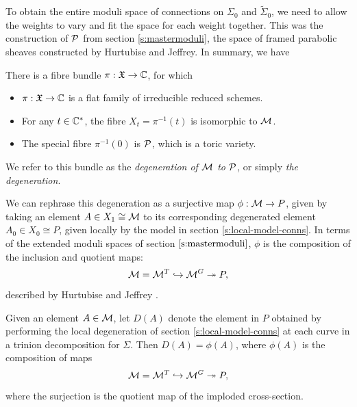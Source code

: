 	To obtain the entire moduli space of connections on $\Sigma_0$ and $\tilde{\Sigma}_0$, we need to allow the weights to vary and fit the space for each weight together. This was the construction of $\mathcal{P}$ from section \ref{s:mastermoduli}, the space of framed parabolic sheaves constructed by Hurtubise and Jeffrey. In summary, we have \cite[Theorems 3.17, 4.1]{biswas_degenerations_2021}
	\begin{theorem}
		\label{t:bishurt}
		There is a fibre bundle $\pi: \mathfrak{X} \to \mathbb{C}$, for which
		\begin{itemize}
			\item $\pi:\mathfrak{X}\to \mathbb{C}$ is a flat family of irreducible reduced schemes.
			\item For any $t\in \mathbb{C}^\ast$, the fibre $X_t = \pi^{-1}(t)$ is isomorphic to $\mathcal{M}$.
			\item The special fibre $\pi^{-1}(0)$ is $\mathcal{P}$, which is a toric variety.
		\end{itemize}
		We refer to this bundle as the \emph{degeneration of $\mathcal{M}$ to $\mathcal{P}$}, or simply \emph{the degeneration}.
	\end{theorem}
	We can rephrase this degeneration as a surjective map $\phi:\mathcal{M}\to P$, given by taking an element $A\in X_1 \cong \mathcal{M}$ to its corresponding degenerated element $A_0 \in X_0 \cong P$, given locally by the model in section \ref{s:local-model-conns}. In terms of the extended moduli spaces of section $\ref{s:mastermoduli}$, $\phi$ is the composition of the inclusion and quotient maps:
	\begin{equation}
		\mathcal{M} = \mathcal{M}^T \hookrightarrow \mathcal{M}^G \twoheadrightarrow P,
	\end{equation}
	described by Hurtubise and Jeffrey \cite[prop 2.37]{hurtubise_representations_2000}. 
	\begin{lemma}
		\label{l:degen-equal}
		Given an element $A\in \mathcal{M}$, let $D(A)$ denote the element in $P$ obtained by performing the local degeneration of section \ref{s:local-model-conns} at each curve in a trinion decomposition for $\Sigma$. Then $D(A) = \phi(A)$, where $\phi(A)$ is the composition of maps 
		\begin{equation}
			\mathcal{M} = \mathcal{M}^T \hookrightarrow \mathcal{M}^G \twoheadrightarrow P,
		\end{equation}
		where the surjection is the quotient map of the imploded cross-section.
	\end{lemma}
